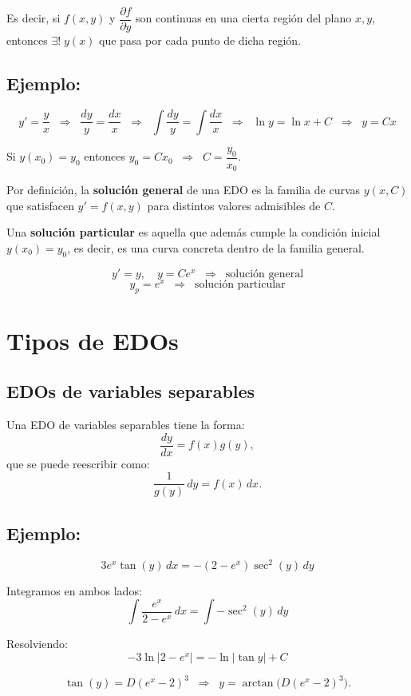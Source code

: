 \documentclass[a4paper,12pt]{article}
\begin{document}
Es decir, si $f(x,y)$ y $\dfrac{\partial f}{\partial y}$ son continuas en una cierta región del plano $x,y$,  
entonces $\exists! \; y(x)$ que pasa por cada punto de dicha región.

\subsection*{Ejemplo:}
\[
y' = \frac{y}{x} \;\;\Rightarrow\;\; \frac{dy}{y} = \frac{dx}{x}
\;\;\Rightarrow\;\; \int \frac{dy}{y} = \int \frac{dx}{x}
\;\;\Rightarrow\;\; \ln y = \ln x + C \;\;\Rightarrow\;\; y = Cx
\]

Si $y(x_0)=y_0$ entonces $y_0 = Cx_0 \;\;\Rightarrow\;\; C = \dfrac{y_0}{x_0}$.

\medskip

Por definición, la \textbf{solución general} de una EDO es la familia de curvas $y(x,C)$ que satisfacen $y'=f(x,y)$ para distintos valores admisibles de $C$.  

Una \textbf{solución particular} es aquella que además cumple la condición inicial $y(x_0)=y_0$,  
es decir, es una curva concreta dentro de la familia general.

\[
y' = y, \quad y = C e^x \;\; \Rightarrow \;\; \text{solución general}
\]
\[
y_p = e^x \;\; \Rightarrow \;\; \text{solución particular}
\]

\newpage
\section{Tipos de EDOs}

\subsection{EDOs de variables separables}

Una EDO de variables separables tiene la forma:
\[
\frac{dy}{dx} = f(x)g(y),
\]
que se puede reescribir como:
\[
\frac{1}{g(y)}\,dy = f(x)\,dx.
\]

\subsection*{Ejemplo:}
\[
3 e^x \tan(y)\, dx = -(2 - e^x)\sec^2(y)\, dy
\]

Integramos en ambos lados:
\[
\int \frac{e^x}{2-e^x}\,dx = \int -\sec^2(y)\,dy
\]

Resolviendo:
\[
-3 \ln|2-e^x| = -\ln|\tan y| + C
\]

\[
\tan(y) = D (e^x-2)^3 \;\;\Rightarrow\;\; y = \arctan\!\big(D(e^x-2)^3\big).
\]
\end{document}
